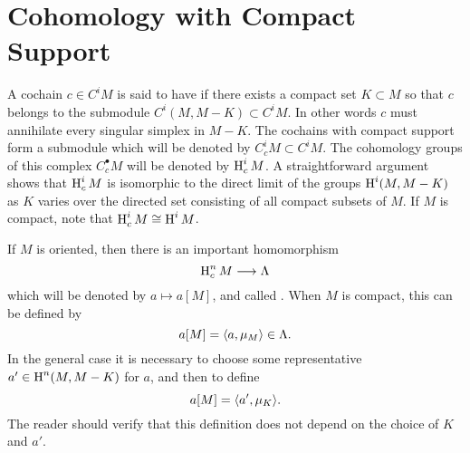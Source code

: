 \documentclass[../main]{subfiles}
\begin{document}
\section{Cohomology with Compact Support}
A cochain $c \in C^i M$ is said to have  if there exists a compact set $K \subset M$ so that $c$ belongs to the submodule $C^i(M, M - K) \subset C^i M$. In other words $c$ must annihilate every singular simplex in $M - K$. The cochains with compact support form a submodule which will be denoted by $C^i_{c} M \subset C^i M$. The cohomology groups of this complex $C^\bullet_{c} M$ will be denoted by $\operatorname{H}^i_{c} M$. A straightforward argument \cite[p. 162]{spanier1981} shows that $\operatorname{H}^i_{c} M$ is isomorphic to the direct limit of the groups $\operatorname{H}^i(M, M - K)$ as $K$ varies over the directed set consisting of all compact subsets of $M$. If $M$ is compact, note that $\operatorname{H}^i_{c} M \cong \operatorname{H}^i M$. 

If $M$ is oriented, then there is an important homomorphism \[\operatorname{H}^n_{c} M \longrightarrow \Lambda\] which will be denoted by $a \mapsto a[M]$, and called . When $M$ is compact, this can be defined by \[a[M] = \langle a,\mu_M\rangle \in \Lambda.\] In the general case it is necessary to choose some representative \newline $a' \in \operatorname{H}^n(M, M - K)$ for $a$, and then to define \[a[M] = \langle a',\mu_K\rangle.\] The reader should verify that this definition does not depend on the choice of $K$ and $a'$. 
\end{document}
